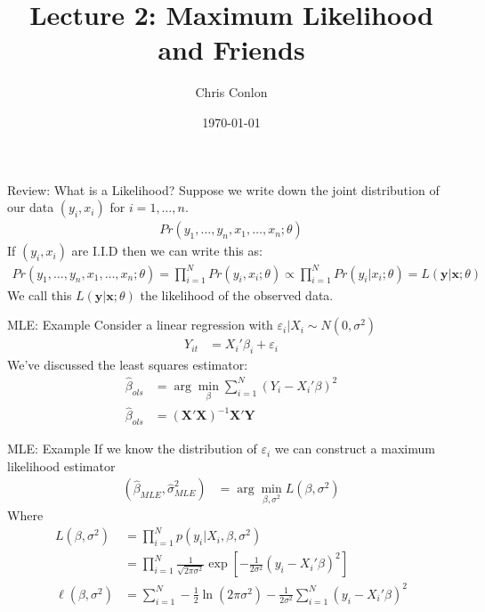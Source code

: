 \documentclass[aspectratio=169]{beamer}
\title{Lecture 2: Maximum Likelihood and Friends}
\author{Chris Conlon }
\institute{NYU Stern }
\date{\today}
\begin{document}
\maketitle



\begin{frame}{Review: What is a Likelihood?}
Suppose we write down the joint distribution of our data $(y_i,x_i)$ for $i=1,\ldots,n$.
\begin{align*}
Pr(y_1,\ldots,y_n, x_1,\ldots,x_n ; \theta)
\end{align*}
If  $(y_i,x_i)$ are I.I.D then we can write this as:
\begin{align*}
 Pr(y_1,\ldots,y_n, x_1,\ldots,x_n ; \theta) = \prod_{i=1}^N Pr(y_i, x_i ; \theta) 
 \propto \prod_{i=1}^N Pr(y_i | x_i ; \theta)
 =L( \mathbf{y}| \mathbf{x} ; \theta )
\end{align*}
We call this $L( \mathbf{y}| \mathbf{x} ; \theta )$ the \alert{likelihood} of the observed data.
\end{frame}


\begin{frame}{MLE: Example}
Consider a linear regression with $\varepsilon_i | X_i \sim N(0,\sigma^2)$
\begin{align*}
Y_{it} &= X_{i}'\beta_i + \varepsilon_{i}
\end{align*}
We've discussed the \alert{least squares estimator}:
\begin{align*}
\widehat{\beta}_{ols} &= \arg \min_{\beta} \sum_{i=1}^N (Y_i - X_i' \beta)^2\\
\widehat{\beta}_{ols} &= (\mathbf{X}'\mathbf{X})^{-1} \mathbf{X}' \mathbf{Y}
\end{align*}
\end{frame}


\begin{frame}{MLE: Example}
If we know the distribution of $\varepsilon_i$ we can construct a \alert{maximum likelihood estimator}
\begin{align*}
(\widehat{\beta}_{MLE},\widehat{\sigma}^2_{MLE}) &= \arg \min_{\beta,\sigma^2} L(\beta,\sigma^2)
\end{align*}
Where 
\begin{align*} 
L(\beta,\sigma^2) &= \prod_{i=1}^N p(y_i | X_i,\beta,\sigma^2) \\
                  &= \prod_{i=1}^N \frac{1}{\sqrt{2 \pi \sigma^2}} \exp \left[-\frac{1}{2\sigma^2}(y_i - X_i' \beta)^2 \right]\\
\ell(\beta,\sigma^2) &= \sum_{i=1}^N -\frac{1}{2} \ln (2 \pi \sigma^2) - \frac{1}{2 \sigma^2} \sum_{i=1}^N(y_i - X_i' \beta)^2
\end{align*}
\end{frame}
\end{document}
